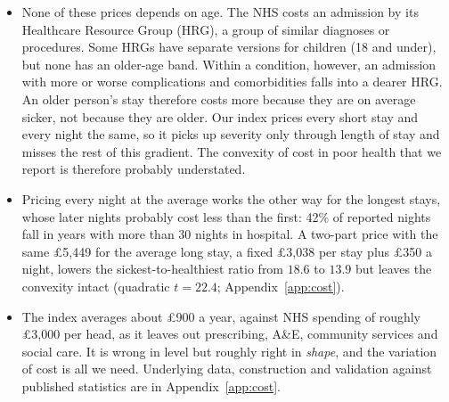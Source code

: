 \documentclass[11pt]{article}
\begin{document}
\begin{itemize}
\begin{itemize}
			\item $c_{\text{op}} = \pounds191$, the average out-patient attendance across consultant-led (\pounds203) and non-consultant-led (\pounds132) attendances and out-patient procedures (\pounds232).
		\end{itemize}
		The GP price is not in the collection. $c_{\text{gp}} = \pounds40$ is a 10-minute surgery consultation, including direct care staff and excluding qualification costs (\pounds48 with them), from PSSRU's \emph{Unit Costs of Health and Social Care 2025} \citep[Table~9.4.2]{pssru2025}.
		\item None of these prices depends on age. The NHS costs an admission by its Healthcare Resource Group (HRG), a group of similar diagnoses or procedures. Some HRGs have separate versions for children (18 and under), but none has an older-age band. Within a condition, however, an admission with more or worse complications and comorbidities falls into a dearer HRG. An older person's stay therefore costs more because they are on average sicker, not because they are older. Our index prices every short stay and every night the same, so it picks up severity only through length of stay and misses the rest of this gradient. The convexity of cost in poor health that we report is therefore probably understated.
		\item Pricing every night at the average works the other way for the longest stays, whose later nights probably cost less than the first: 42\% of reported nights fall in years with more than 30 nights in hospital. A two-part price with the same \pounds5{,}449 for the average long stay, a fixed \pounds3{,}038 per stay plus \pounds350 a night, lowers the sickest-to-healthiest ratio from $18.6$ to $13.9$ but leaves the convexity intact (quadratic $t = 22.4$; Appendix~\ref{app:cost}).
		\item The index averages about \pounds900 a year, against NHS spending of roughly \pounds3{,}000 per head, as it leaves out prescribing, A\&E, community services and social care. It is wrong in level but roughly right in \emph{shape}, and the variation of cost is all we need. Underlying data, construction and validation against published statistics are in Appendix~\ref{app:cost}.
	\end{itemize}
	
\end{document}
